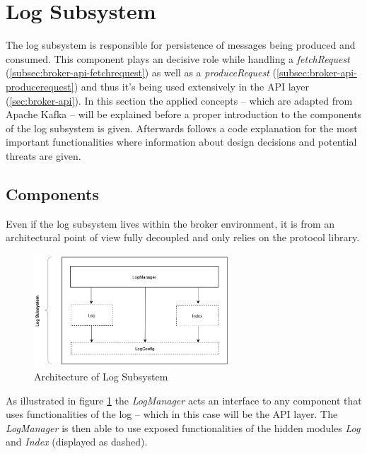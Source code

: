 \newpage
\section{Log Subsystem}

The log subsystem is responsible for persistence of messages being
produced and consumed. This component plays an decisive role while handling a
\textit{fetchRequest} (\ref{subsec:broker-api-fetchrequest}) as well as a
\textit{produceRequest} (\ref{subsec:broker-api-producerequest}) and thus it's
being used extensively in the API layer (\ref{sec:broker-api}). In this section
the applied concepts -- which are adapted from Apache Kafka -- will be explained
before a proper introduction to the components of the log subsystem is given.
Afterwards follows a code explanation for the  most important functionalities where
information about design decisions and potential threats are given.

\subsection{Components}

Even if the log subsystem lives within the broker environment, it is from an
architectural point of view fully decoupled and only relies on the protocol
library.

\begin{figure}[H]
    \centering
    \includegraphics[width=0.65\textwidth]{images/broker-log-overview.png}
    \caption{Architecture of Log Subsystem}
    \label{fig:broker-log-overview}
\end{figure}

As illustrated in figure \ref{fig:broker-log-overview} the \textit{LogManager}
acts an interface to any component that uses functionalities of the log -- which
in this case will be the API layer. The \textit{LogManager} is then able to use
exposed functionalities of the hidden modules \textit{Log} and
\textit{Index} (displayed as dashed). 

